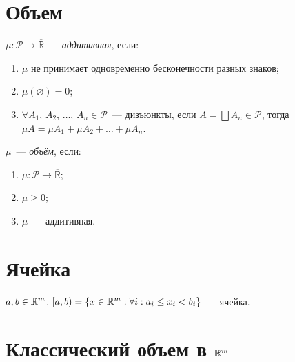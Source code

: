 \documentclass{article}
\begin{document}
    \section{Объем}
    
        $\mu : \mathcal{P} \rightarrow \overline{\mathbb{R}}$~--- \textit{аддитивная}, если:
        
        \begin{enumerate}
        
            \item $\mu$ не принимает одновременно бесконечности разных знаков;
            
            \item $\mu(\varnothing) = 0$;
            
            \item $\forall A_1$, $A_2$, $\ldots$, $A_n \in \mathcal{P}$~--- дизъюнкты, если $A = \bigsqcup A_n \in \mathcal{P}$, тогда $\mu A = \mu A_1 + \mu A_2 + \ldots + \mu A_n$.
        
        \end{enumerate}
        
        $\mu$~--- \textit{объём}, если:
        
        \begin{enumerate}
        
            \item $\mu : \mathcal{P} \rightarrow \overline{\mathbb{R}}$;
            
            \item $\mu \geq 0$;
            
            \item $\mu$~--- аддитивная.
            
        \end{enumerate}
        
    \newpage
    
    \section{Ячейка}
    
        $a, b \in \mathbb{R}^m$, $[a, b) = \left\{ x \in \mathbb{R}^m : \forall i : a_i \leq x_i < b_i \right\}$~--- ячейка.
        
    \newpage
    
    \section{Классический объем в $\mathbb{R}^m$}
    
\end{document}
